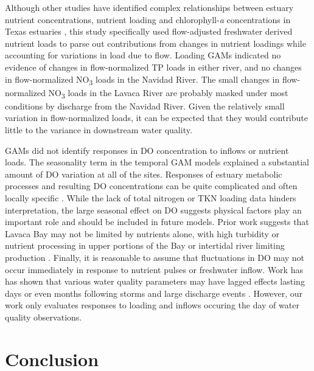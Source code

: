\documentclass[water,article,submit,oneauthor]{Definitions/mdpi}
\begin{document}
Although other studies have identified complex relationships between
estuary nutrient concentrations, nutrient loading and
chlorophyll-\emph{a} concentrations in Texas estuaries
\citep{ornolfsdottirNutrientPulsingRegulator2004, doradoUnderstandingInteractionsFreshwater2015, ciraPhytoplanktonDynamicsLowInflow2021, tominackVariabilityPhytoplanktonBiomass2022},
this study specifically used flow-adjusted freshwater derived nutrient
loads to parse out contributions from changes in nutrient loadings while
accounting for variations in load due to flow. Loading GAMs indicated no
evidence of changes in flow-normalized TP loads in either river, and no
changes in flow-normalized NO\textsubscript{3} loads in the Navidad
River. The small changes in flow-normalized NO\textsubscript{3} loads in
the Lavaca River are probably masked under most conditions by discharge
from the Navidad River. Given the relatively small variation in
flow-normalized loads, it can be expected that they would contribute
little to the variance in downstream water quality.

GAMs did not identify responses in DO concentration to inflows or
nutrient loads. The seasonality term in the temporal GAM models
explained a substantial amount of DO variation at all of the sites.
Responses of estuary metabolic processes and resulting DO concentrations
can be quite complicated and often locally specific
\citep{caffreyFactorsControllingNet2004}. While the lack of total
nitrogen or TKN loading data hinders interpretation, the large seasonal
effect on DO suggests physical factors play an important role and should
be included in future models. Prior work suggests that Lavaca Bay may
not be limited by nutrients alone, with high turbidity or nutrient
processing in upper portions of the Bay or intertidal river limiting
production \citep{russell_effect_2006}. Finally, it is reasonable to
assume that fluctuations in DO may not occur immediately in response to
nutrient pulses or freshwater inflow. Work has has shown that various
water quality parameters may have lagged effects lasting days or even
months following storms and large discharge events
\citep{mooney_watershed_2012, wetzExtremeFutureEstuaries2013, bukaveckas_influence_2020, walkerTimescalesMagnitudeWater2021}.
However, our work only evaluates responses to loading and inflows
occuring the day of water quality observations.

\hypertarget{conclusion}{%
\section{Conclusion}\label{conclusion}}
\end{document}
